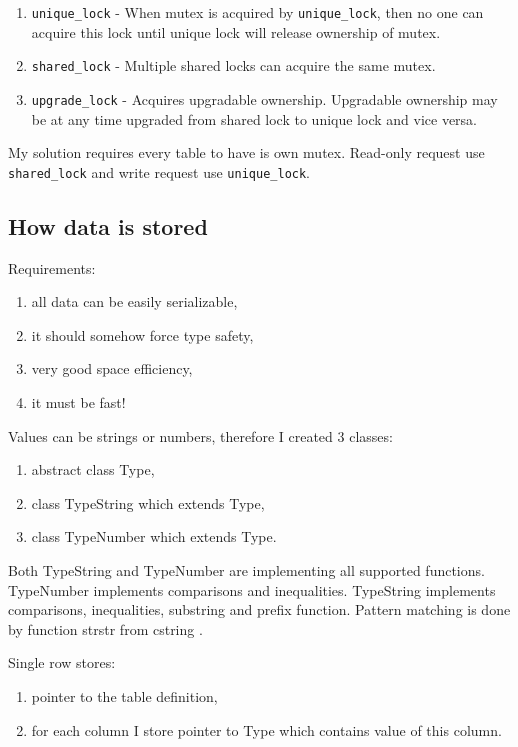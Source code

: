 \documentclass[10pt,a4paper]{article}
\begin{document}
\begin{enumerate}
\item \verb|unique_lock| - When mutex is acquired by \verb|unique_lock|, then no one can acquire this lock until unique lock will release ownership of mutex. 
\item \verb|shared_lock| - Multiple shared locks can acquire the same mutex.
\item \verb|upgrade_lock| - Acquires upgradable ownership. Upgradable ownership may be at any time upgraded from shared lock to unique lock and vice versa.
\end{enumerate}

My solution requires every table to have is own mutex. Read-only request use \verb|shared_lock| and write request use \verb|unique_lock|.

\subsection{How data is stored}

Requirements:
\begin{enumerate}
\item all data can be easily serializable,
\item it should somehow force type safety,
\item very good space efficiency,
\item it must be fast!
\end{enumerate}
Values can be strings or numbers, therefore I created 3 classes:
\begin{enumerate}
\item abstract class Type,
\item class TypeString which extends Type,
\item class TypeNumber which extends Type.
\end{enumerate}

Both TypeString and TypeNumber are implementing all supported functions. TypeNumber implements comparisons and inequalities. TypeString implements comparisons, inequalities, substring and prefix function. Pattern matching is done by function strstr from cstring \cite{STRSTR}.
\bigskip

Single row stores:
\begin{enumerate}
\item pointer to the table definition,
\item for each column I store pointer to Type which contains value of this column.
\end{enumerate}
\end{document}
